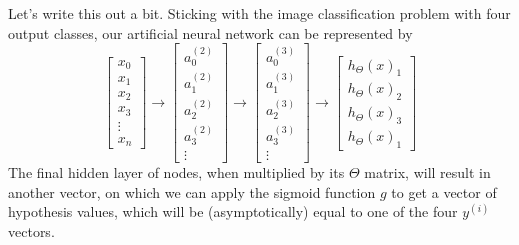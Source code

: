 Let's write this out a bit. Sticking with the image classification problem with four output classes, our artificial neural network can be represented by
$$
\left[\begin{array}{c} x_0 \\ x_1 \\  x_2 \\ x_3 \\ \vdots \\ x_n\end{array}\right] \to
\left[\begin{array}{c} a_0^{(2)} \\ a_1^{(2)} \\ a_2^{(2)} \\ a_3^{(2)} \\ \vdots \end{array}\right] \to 
\left[\begin{array}{c} a_0^{(3)} \\ a_1^{(3)} \\ a_2^{(3)} \\ a_3^{(3)} \\ \vdots \end{array}\right] \to 
\left[\begin{array}{c} h_\Theta\left(x\right)_1 \\ h_\Theta\left(x\right)_2 \\ h_\Theta\left(x\right)_3 \\ h_\Theta\left(x\right)_1 \end{array}\right]
$$
The final hidden layer of nodes, when multiplied by its $\Theta$ matrix, will result in another vector, on which we can apply the sigmoid function $g$ to get a vector of hypothesis values, which will be (asymptotically) equal to one of the four $y^{(i)}$ vectors.  

























